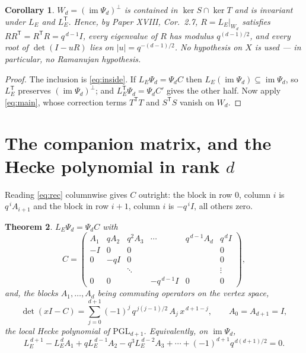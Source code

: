 \documentclass[11pt]{amsart}
\theoremstyle{plain}
\newtheorem{theorem}{Theorem}
\newtheorem{corollary}[theorem]{Corollary}
\theoremstyle{definition}
\theoremstyle{remark}
\newcommand{\LE}{L_E}
\newcommand{\im}{\operatorname{im}}
\newcommand{\tp}{\mathsf{T}}
\begin{document}
\begin{corollary}\label{cor:W}
$W_d=(\im\Psi_d)^{\perp}$ is contained in $\ker S\cap\ker T$ and is invariant under $\LE$ and
$\LE^{\tp}$. Hence, by Paper XVIII, Cor.~2.7, $R=\LE|_{W_d}$ satisfies
$RR^{\tp}=R^{\tp}R=q^{\,d-1}I$, every eigenvalue of $R$ has modulus $q^{(d-1)/2}$, and every
root of $\det(I-uR)$ lies on $|u|=q^{-(d-1)/2}$. No hypothesis on $X$ is used --- in
particular, no Ramanujan hypothesis.
\end{corollary}

\begin{proof}
The inclusion is \eqref{eq:inside}. If $\LE\Psi_d=\Psi_dC$ then $\LE(\im\Psi_d)\subseteq
\im\Psi_d$, so $\LE^{\tp}$ preserves $(\im\Psi_d)^{\perp}$; and $\LE^{\tp}\Psi_d=\Psi_dC'$
gives the other half. Now apply \eqref{eq:main}, whose correction terms $T^{\tp}T$ and
$S^{\tp}S$ vanish on $W_d$.
\end{proof}

\section{The companion matrix, and the Hecke polynomial in rank $d$}

Reading \eqref{eq:rec} columnwise gives $C$ outright: the block in row $0$, column $i$ is
$q^{\,i}A_{i+1}$ and the block in row $i+1$, column $i$ is $-q^{\,i}I$, all others zero.

\begin{theorem}\label{thm:hecke}
$\LE\Psi_d=\Psi_dC$ with
\[
  C=\begin{pmatrix}
     A_1 & qA_2 & q^{2}A_3 & \cdots & q^{\,d-1}A_d & q^{\,d}I\\
     -I  & 0    & 0        &        &              & 0\\
     0   & -qI  & 0        &        &              & 0\\
         &      & \ddots   &        &              & \vdots\\
     0   & 0    &          & -q^{\,d-1}I & 0       & 0
    \end{pmatrix},
\]
and, the blocks $A_1,\dots,A_d$ being commuting operators on the vertex space,
\[
  \det(xI-C)=\sum_{j=0}^{d+1}(-1)^{j}\,q^{\,j(j-1)/2}\,A_j\,x^{\,d+1-j},
  \qquad A_0=A_{d+1}=I ,
\]
the local Hecke polynomial of $\mathrm{PGL}_{d+1}$. Equivalently, on $\im\Psi_d$,
\[
  \LE^{\,d+1}-\LE^{\,d}A_1+q\LE^{\,d-1}A_2-q^{3}\LE^{\,d-2}A_3+\cdots
  +(-1)^{d+1}q^{\,d(d+1)/2}=0 .
\]
\end{theorem}
\end{document}
